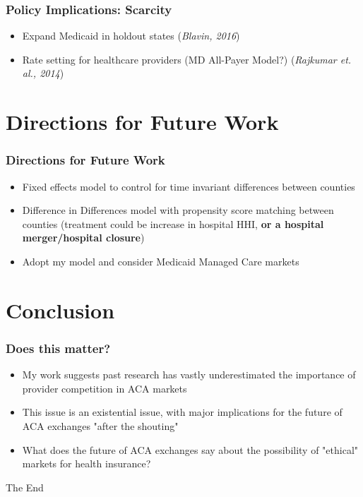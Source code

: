 \documentclass{beamer}
\begin{document}
\begin{frame}
\frametitle{Policy Implications: Scarcity}
\begin{itemize}
\item Expand Medicaid in holdout states (\textit{Blavin, 2016})
\item Rate setting for healthcare providers (MD All-Payer Model?) (\textit{Rajkumar et. al., 2014})
\end{itemize}
\end{frame}


\section[Future Work]{Directions for Future Work}

\begin{frame}
\frametitle{Directions for Future Work}
\begin{itemize}
\item Fixed effects model to control for time invariant differences between counties
\item Difference in Differences model with propensity score matching between counties (treatment could be increase in hospital HHI, \textbf{or a hospital merger/hospital closure})
\item Adopt my model and consider Medicaid Managed Care markets
\end{itemize}
\end{frame}

\section[Conclusion]{Conclusion}

\begin{frame}
\frametitle{Does this matter?}
\begin{itemize}
\item My work suggests past research has vastly underestimated the importance of provider competition in ACA markets
\item This issue is an existential issue, with major implications for the future of ACA exchanges "after the shouting"
\item What does the future of ACA exchanges say about the possibility of "ethical" markets for health insurance?
\end{itemize}
\end{frame}

\begin{frame}
\Huge{\centerline{The End}}
\end{frame}
\end{document}
